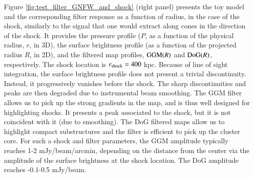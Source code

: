 \documentclass[traditabstract]{aa}
\begin{document}
Figure \ref{fig:test_filter_GNFW_and_shock} (right panel) presents the toy model and the corresponding filter response as a function of radius, in the case of the shock, similarly to the signal that one would extract along cones in the direction of the shock. It provides the pressure profile ($P$, as a function of the physical radius, $r$, in 3D), the surface brightness profile (as a function of the projected radius $R$, in 2D), and the filtered map profiles, ${\rm GGM}(R)$ and ${\rm DoG}(R)$, respectively. The shock location is $r_{\rm shock} = 400$ kpc. Because of line of sight integration, the surface brightness profile does not present a trivial discontinuity. Instead, it progressively vanishes before the shock. The sharp discontinuities and peaks are then degraded due to instrumental beam smoothing. The GGM filter allows us to pick up the strong gradients in the map, and is thus well designed for highlighting shocks. It presents a peak associated to the shock, but it is not coincident with it (due to smoothing). The DoG filtered maps allow us to highlight compact substructures and the filter is efficient to pick up the cluster core. For such a shock and filter parameters, the GGM amplitude typically reaches 1-2 mJy/beam/arcmin, depending on the distance from the center via the amplitude of the surface brightness at the shock location. The DoG amplitude reaches -0.1-0.5 mJy/beam.
\end{document}
